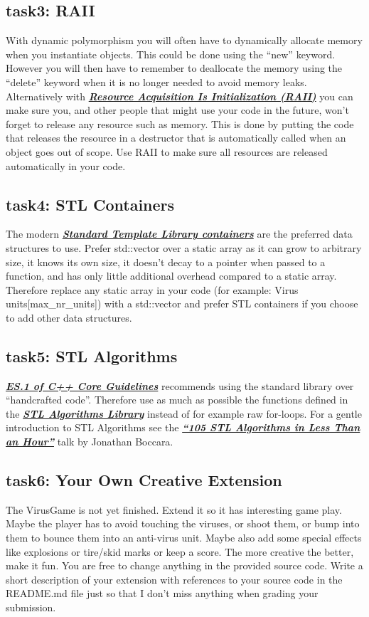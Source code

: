 \documentclass[12pt]{article}
\newcommand*{\link}[2]{\href{#1}{\color{blue}\textbf{\textit{#2}}}}
\begin{document}
\subsection{task3: RAII}
With dynamic polymorphism you will often have to dynamically allocate
memory when you instantiate objects. This could be done using the
``new'' keyword. However you will then have to remember to deallocate
the memory using the ``delete'' keyword when it is no longer needed to
avoid memory leaks. Alternatively with
\link{https://en.cppreference.com/w/cpp/language/raii}{Resource
  Acquisition Is Initialization (RAII)} you can make sure you, and
other people that might use your code in the future, won't forget
to release any resource such as memory. This is done by putting the code
that releases the resource in a destructor that is automatically
called when an object goes out of scope. Use RAII to make sure all
resources are released automatically in your code.

\subsection{task4: STL Containers}
The modern \link{http://www.cplusplus.com/reference/stl/}{Standard
  Template Library containers} are the preferred data structures to
use. Prefer std::vector over a static array as it can grow to
arbitrary size, it knows its own size, it doesn't decay to a pointer when
passed to a function, and has only little additional overhead compared
to a static array. Therefore replace any static array in your code
(for example: Virus units[max\_nr\_units]) with a std::vector and
prefer STL containers if you choose to add other data structures.

\subsection{task5: STL Algorithms}
\link{https://isocpp.github.io/CppCoreGuidelines/CppCoreGuidelines\#Res-lib}
{ES.1 of C++ Core Guidelines} recommends using the standard library
over ``handcrafted code''.  Therefore use as much as possible the
functions defined in the
\link{https://en.cppreference.com/w/cpp/algorithm} {STL Algorithms
  Library} instead of for example raw for-loops. For a gentle
introduction to STL Algorithms see the
\link{https://www.youtube.com/watch?v=2olsGf6JIkU} {``105 STL
  Algorithms in Less Than an Hour''} talk by Jonathan Boccara.

\subsection{task6: Your Own Creative Extension}
The VirusGame is not yet finished. Extend it so it has interesting
game play. Maybe the player has to avoid touching the viruses, or
shoot them, or bump into them to bounce them into an anti-virus
unit. Maybe also add some special effects like explosions or tire/skid
marks or keep a score. The more creative the better, make it fun. You
are free to change anything in the provided source code. Write a short
description of your extension with references to your source code in
the README.md file just so that I don't miss anything when grading
your submission.
\end{document}
